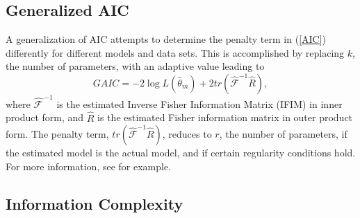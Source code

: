 \subsection{Generalized AIC}

A generalization of AIC attempts to determine the penalty term in
(\ref{AIC}) differently for different models and data sets. This
is accomplished by replacing $k$, the number of parameters, with
an adaptive value leading to
\begin{equation}
GAIC=-2\log L\left(\hat{\theta}_{m}\right)+2tr\left(\hat{\mathcal{F}}^{-1}\hat{R}\right),\label{GAIC}
\end{equation}
where $\hat{\mathcal{F\,}}^{-1}$ is the estimated Inverse Fisher
Information Matrix (IFIM) in inner product form, and $\hat{R}$ is
the estimated Fisher information matrix in outer product form. The
penalty term, $tr\left(\hat{\mathcal{F}}^{-1}\hat{R}\right)$, reduces
to $r$, the number of parameters, if the estimated model is the actual
model, and if certain regularity conditions hold. For more information,
see \citet{Take:1976} for example.


\subsection{Information Complexity}

